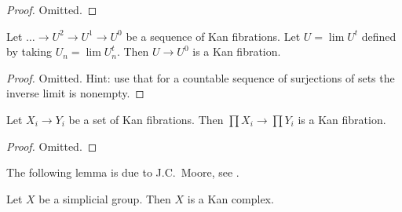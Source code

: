 \begin{proof}
Omitted.
\end{proof}

\begin{lemma}
\label{lemma-limit-kan}
Let $\ldots \to U^2 \to U^1 \to U^0$ be a sequence of Kan
fibrations. Let $U = \lim U^t$ defined by taking $U_n = \lim U_n^t$.
Then $U \to U^0$ is a Kan fibration.
\end{lemma}

\begin{proof}
Omitted. Hint: use that for a countable sequence of surjections of sets
the inverse limit is nonempty.
\end{proof}

\begin{lemma}
\label{lemma-product-kan}
Let $X_i \to Y_i$ be a set of Kan fibrations. Then
$\prod X_i \to \prod Y_i$ is a Kan fibration.
\end{lemma}

\begin{proof}
Omitted.
\end{proof}

\noindent
The following lemma is due to J.C.\ Moore, see \cite{Moore-Cartan}.

\begin{lemma}
\label{lemma-simplicial-group-kan}
Let $X$ be a simplicial group. Then $X$ is a Kan complex.
\end{lemma}

